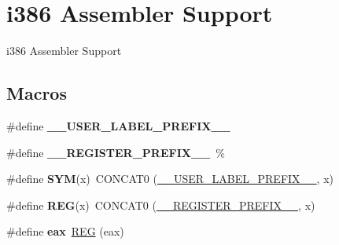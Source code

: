 \hypertarget{group__RTEMSScoreCPUi386ASM}{}\section{i386 Assembler Support}
\label{group__RTEMSScoreCPUi386ASM}


i386 Assembler Support  


\subsection*{Macros}
\begin{DoxyCompactItemize}
\item 
\mbox{\label{group__RTEMSScoreCPUi386ASM_gaff6bf0ff0fa3b5cbd23a8ae1131c87a9}} 
\#define {\bfseries \+\_\+\+\_\+\+U\+S\+E\+R\+\_\+\+L\+A\+B\+E\+L\+\_\+\+P\+R\+E\+F\+I\+X\+\_\+\+\_\+}
\item 
\mbox{\label{group__RTEMSScoreCPUi386ASM_ga08d4062230ffc8494f4be4f6447497e4}} 
\#define {\bfseries \+\_\+\+\_\+\+R\+E\+G\+I\+S\+T\+E\+R\+\_\+\+P\+R\+E\+F\+I\+X\+\_\+\+\_\+}~\%
\item 
\mbox{\label{group__RTEMSScoreCPUi386ASM_gafe05d428a5f345f51fb591debb815325}} 
\#define {\bfseries S\+YM}(x)~C\+O\+N\+C\+A\+T0 (\mbox{\hyperlink{group__RTEMSScoreCPUx86-64ASM_gaff6bf0ff0fa3b5cbd23a8ae1131c87a9}{\+\_\+\+\_\+\+U\+S\+E\+R\+\_\+\+L\+A\+B\+E\+L\+\_\+\+P\+R\+E\+F\+I\+X\+\_\+\+\_\+}}, x)
\item 
\mbox{\label{group__RTEMSScoreCPUi386ASM_gacee196421e9a06f7700bb3064b13b37a}} 
\#define {\bfseries R\+EG}(x)~C\+O\+N\+C\+A\+T0 (\mbox{\hyperlink{group__RTEMSScoreCPUV850ASM_ga08d4062230ffc8494f4be4f6447497e4}{\+\_\+\+\_\+\+R\+E\+G\+I\+S\+T\+E\+R\+\_\+\+P\+R\+E\+F\+I\+X\+\_\+\+\_\+}}, x)
\item 
\mbox{\label{group__RTEMSScoreCPUi386ASM_ga0cd33b56f758e32091005e241266d0cf}} 
\#define {\bfseries eax}~\mbox{\hyperlink{group__RTEMSScoreCPUx86-64ASM_gacee196421e9a06f7700bb3064b13b37a}{R\+EG}} (eax)
\item 
\mbox{\label{group__RTEMSScoreCPUi386ASM_ga77ad1d1f6218e5e03a3183da0669177b}} 

\end{DoxyCompactItemize}
